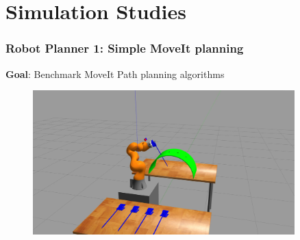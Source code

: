 \section{Simulation Studies}

\begin{frame}
\frametitle{Robot Planner 1: Simple MoveIt planning}
\textbf{Goal}: Benchmark MoveIt Path planning algorithms
\begin{center}
\begin{figure}[!htb]
\centering
\includegraphics[width=0.9\textwidth]{../images/robot_planner1/robot_planner1_5.jpg}
\end{figure}
\end{center}
\end{frame}

